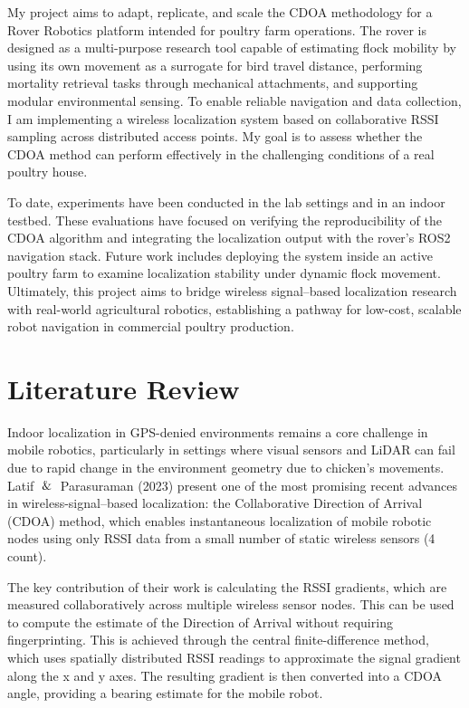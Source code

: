 \documentclass[conference]{IEEEtran}
\begin{document}
My project aims to adapt, replicate, and scale the CDOA methodology for a Rover Robotics platform intended for poultry farm operations. The rover is designed as a multi-purpose research tool capable of estimating flock mobility by using its own movement as a surrogate for bird travel distance, performing mortality retrieval tasks through mechanical attachments, and supporting modular environmental sensing. To enable reliable navigation and data collection, I am implementing a wireless localization system based on collaborative RSSI sampling across distributed access points. My goal is to assess whether the CDOA method can perform effectively in the challenging conditions of a real poultry house.

To date, experiments have been conducted in the lab settings and in an indoor testbed. These evaluations have focused on verifying the reproducibility of the CDOA algorithm and integrating the localization output with the rover’s ROS2 navigation stack. Future work includes deploying the system inside an active poultry farm to examine localization stability under dynamic flock movement. Ultimately, this project aims to bridge wireless signal–based localization research with real-world agricultural robotics, establishing a pathway for low-cost, scalable robot navigation in commercial poultry production.

\section{Literature Review}

Indoor localization in GPS-denied environments remains a core challenge in mobile robotics, particularly in settings where visual sensors and LiDAR can fail due to rapid change in the environment geometry due to chicken's movements. Latif $\And$ Parasuraman (2023) \cite{b1} present one of the most promising recent advances in wireless-signal–based localization: the Collaborative Direction of Arrival (CDOA) method, which enables instantaneous localization of mobile robotic nodes using only RSSI data from a small number of static wireless sensors (4 count).

The key contribution of their work is calculating the RSSI gradients, which are measured collaboratively across multiple wireless sensor nodes. This can be used to compute the estimate of the Direction of Arrival without requiring fingerprinting. This is achieved through the central finite-difference method, which uses spatially distributed RSSI readings to approximate the signal gradient along the x and y axes. The resulting gradient is then converted into a CDOA angle, providing a bearing estimate for the mobile robot.
\end{document}
